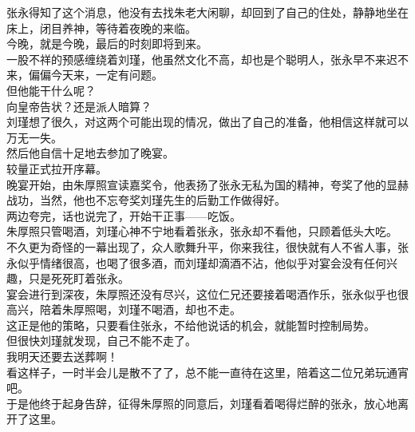 \begin{multicols}{\theparacolNo}
张永得知了这个消息，他没有去找朱老大闲聊，却回到了自己的住处，静静地坐在床上，闭目养神，等待着夜晚的来临。\\

今晚，就是今晚，最后的时刻即将到来。\\

一股不祥的预感缠绕着刘瑾，他虽然文化不高，却也是个聪明人，张永早不来迟不来，偏偏今天来，一定有问题。\\

但他能干什么呢？\\

向皇帝告状？还是派人暗算？\\

刘瑾想了很久，对这两个可能出现的情况，做出了自己的准备，他相信这样就可以万无一失。\\

然后他自信十足地去参加了晚宴。\\

较量正式拉开序幕。\\

晚宴开始，由朱厚照宣读嘉奖令，他表扬了张永无私为国的精神，夸奖了他的显赫战功，当然，他也不忘夸奖刘瑾先生的后勤工作做得好。\\

两边夸完，话也说完了，开始干正事——吃饭。\\

朱厚照只管喝酒，刘瑾心神不宁地看着张永，张永却不看他，只顾着低头大吃。\\

不久更为奇怪的一幕出现了，众人歌舞升平，你来我往，很快就有人不省人事，张永似乎情绪很高，也喝了很多酒，而刘瑾却滴酒不沾，他似乎对宴会没有任何兴趣，只是死死盯着张永。\\

宴会进行到深夜，朱厚照还没有尽兴，这位仁兄还要接着喝酒作乐，张永似乎也很高兴，陪着朱厚照喝，刘瑾不喝酒，却也不走。\\

这正是他的策略，只要看住张永，不给他说话的机会，就能暂时控制局势。\\

但很快刘瑾就发现，自己不能不走了。\\

我明天还要去送葬啊！\\

看这样子，一时半会儿是散不了了，总不能一直待在这里，陪着这二位兄弟玩通宵吧。\\

于是他终于起身告辞，征得朱厚照的同意后，刘瑾看着喝得烂醉的张永，放心地离开了这里。\\


\end{multicols}
